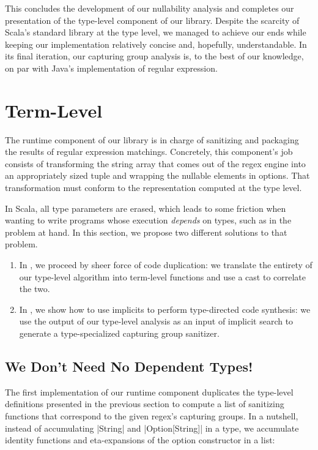 \regexLastIteration

This concludes the development of our nullability analysis and completes our presentation of the type-level component of our library.
Despite the scarcity of Scala's standard library at the type level, we managed to achieve our ends while keeping our implementation relatively concise and, hopefully, understandable.
In its final iteration, our capturing group analysis is, to the best of our knowledge, on par with Java's implementation of regular expression.

\section{Term-Level}
\label{sec:term-level}

The runtime component of our library is in charge of sanitizing and packaging the results of regular expression matchings.
Concretely, this component's job consists of transforming the string array that comes out of the regex engine into an appropriately sized tuple and wrapping the nullable elements in options.
That transformation must conform to the representation computed at the type level.

In Scala, all type parameters are erased, which leads to some friction when wanting to write programs whose execution \emph{depends} on types, such as in the problem at hand. In this section, we propose two different solutions to that problem.

\begin{enumerate}
  \item In , we proceed by sheer force of code duplication: we translate the entirety of our type-level algorithm into term-level functions and use a cast to correlate the two.

  \item In , we show how to use implicits to perform type-directed code synthesis: we use the output of our type-level analysis as an input of implicit search to generate a type-specialized capturing group sanitizer.
\end{enumerate}

\subsection{We Don't Need No Dependent Types!}
\label{subsec:we-ain-t-need-no-dependent-types}

The first implementation of our runtime component duplicates the type-level definitions presented in the previous section to compute a list of sanitizing functions that correspond to the given regex's capturing groups.
In a nutshell, instead of accumulating |String| and |Option[String]| in a type, we accumulate identity functions and eta-expansions of the option constructor in a list:

